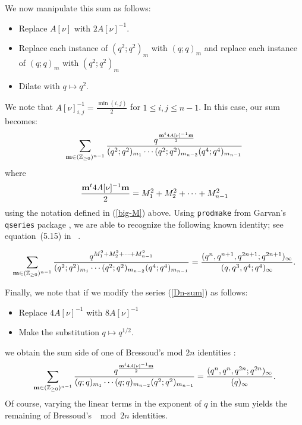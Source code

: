 \documentclass[ALCO,Unicode,published]{cedram}
\begin{document}
We now manipulate this sum as follows:
\begin{itemize}
\item Replace $A[\nu]$ with $2A[\nu]^{-1}$.
\item Replace each instance of $(q^2;q^2)_m$ with $(q;q)_m$ and replace each instance of $(q;q)_m$ with $(q^2;q^2)_m$ 
\item Dilate with $q \mapsto q^2$.
\end{itemize}
We note that $A[\nu]^{-1}_{i,j} = \frac{\min (i,j)}{2}$ for $1 \le i,j \le n-1$.
In this case, our sum becomes:
\begin{equation}\label{Dn-sum}
\sum_{{\bf m} \in (\mathbb{Z}_{\ge 0})^{n-1}}\frac{q^{\frac{{\bf m}^t 4A[\nu]^{-1} {\bf m}}{2}}}{{(q^2};q^2)_{m_1}\cdots (q^2;q^2)_{m_{n-2}}(q^4;q^4)_{m_{n-1}}}
\end{equation}
where
\begin{equation}\label{Ms}
\frac{{\bf m}^t 4A[\nu]^{-1} {\bf m}}{2}= M_1^2 + M_2^2 + \cdots +M_{n-1}^2
\end{equation}
using the notation defined in (\ref{big-M}) above.
Using \texttt{prodmake} from Garvan's \texttt{qseries} package \cite{Ga}, we are able to recognize the following known identity; see equation~(5.15) in ~\cite{War1}.
\begin{thm}
\begin{equation}
\sum_{{\bf m} \in (\mathbb{Z}_{\ge 0})^{n-1}}\frac{q^{M_1^2+M_2^2+\cdots+M_{n-1}^2}}{{(q^2};q^2)_{m_1}\cdots (q^2;q^2)_{m_{n-2}}(q^4;q^4)_{m_{n-1}}} 
= \frac{(q^n,q^{n+1},q^{2n+1};q^{2n+1})_\infty}{(q,q^3,q^4;q^4)_\infty}.
\end{equation}
\end{thm}


Finally, we note that if we modify the series (\ref{Dn-sum}) as follows: 
\begin{itemize}
\item Replace $4A[\nu]^{-1}$ with $8A[\nu]^{-1}$
\item Make the substitution $q\mapsto q^{1/2}.$
\end{itemize}
we obtain the sum side of one of Bressoud's mod $2n$ identities \cite{Br}:
\begin{equation}
\sum_{{\bf m} \in (\mathbb{Z}_{\ge 0})^{n-1}}\frac{q^{\frac{{\bf m}^t 4A[\nu]^{-1} {\bf m}}{2}}}{{(q};q)_{m_1}\cdots (q;q)_{m_{n-2}}(q^2;q^2)_{m_{n-1}}} = 
\frac{(q^n,q^n,q^{2n};q^{2n})_\infty}{(q)_\infty}.
\end{equation}
Of course, varying the linear terms in the exponent of $q$ in the sum yields the remaining of Bressoud's $\mod 2n$ identities.
\end{document}
